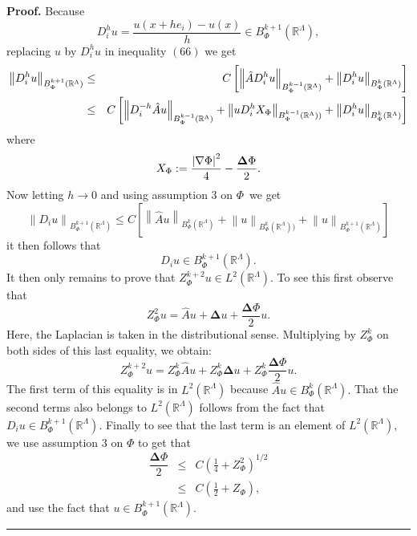 \documentclass{article}
\newenvironment{proof}[1][Proof]{\noindent\textbf{#1.} }{\ \rule{0.5em}{0.5em}}
\begin{document}
\begin{proof}
Because 
\begin{equation*}
D_{i}^{h}u=\dfrac{u(x+he_{i})-u(x)}{h}\in B_{\Phi }^{k+1}(\mathbb{R}%
^{\Lambda }),
\end{equation*}%
replacing $u$ by $D_{i}^{h}u$ in inequality $\left( 66\right) $ we get 
\begin{eqnarray*}
\left\| D_{i}^{h}u\right\| _{B_{\Phi }^{k+1}(\mathbb{R}^{\Lambda })} &\leq &C%
\left[ \left\| \hat{A}D_{i}^{h}u\right\| _{B_{\Phi }^{k-1}(\mathbb{R}%
^{\Lambda })}+\left\| D_{i}^{h}u\right\| _{B_{\Phi }^{k}(\mathbb{R}^{\Lambda
})}\right] \\
&\leq &C\left[ \left\| D_{i}^{-h}\hat{A}u\right\| _{B_{\Phi }^{k-1}(\mathbb{R%
}^{\Lambda })}+\left\| uD_{i}^{h}X_{\Phi }\right\| _{B_{\Phi }^{k-1}(\mathbb{%
R}^{\Lambda }))}+\left\| D_{i}^{h}u\right\| _{B_{\Phi }^{k}(\mathbb{R}%
^{\Lambda })}\right]
\end{eqnarray*}%
where 
\begin{equation*}
X_{\Phi }:=\dfrac{\left| \mathbf{\nabla }\Phi \right| ^{2}}{4}-\dfrac{%
\mathbf{\Delta }\Phi }{2}.
\end{equation*}%
Now letting $h\rightarrow 0$ and using assumption 3 on $\Phi $\ we get 
\begin{equation*}
\left\| D_{i}u\right\| _{B_{\Phi }^{k+1}(\mathbb{R}^{\Lambda })}\leq C\left[
\left\| \hat{A}u\right\| _{B_{\Phi }^{k}(\mathbb{R}^{\Lambda })}+\left\|
u\right\| _{B_{\Phi }^{k}(\mathbb{R}^{\Lambda }))}+\left\| u\right\|
_{B_{\Phi }^{k+1}(\mathbb{R}^{\Lambda })}\right]
\end{equation*}%
it then follows that 
\begin{equation*}
D_{i}u\in B_{\Phi }^{k+1}(\mathbb{R}^{\Lambda }).
\end{equation*}%
It then only remains to prove that $Z_{\Phi }^{k+2}u\in L^{2}(\mathbb{R}%
^{\Lambda })$. To see this first observe that 
\begin{equation}
Z_{\Phi }^{2}u=\hat{A}u+\mathbf{\Delta }u+\dfrac{\mathbf{\Delta }\Phi }{2}u.
\end{equation}%
Here, the Laplacian is taken in the distributional sense. Multiplying by $%
Z_{\Phi }^{k}$ on both sides of this last equality, we obtain:%
\begin{equation}
Z_{\Phi }^{k+2}u=Z_{\Phi }^{k}\hat{A}u+Z_{\Phi }^{k}\mathbf{\Delta }%
u+Z_{\Phi }^{k}\dfrac{\mathbf{\Delta }\Phi }{2}u.
\end{equation}%
The first term of this equality is in $L^{2}(\mathbb{R}^{\Lambda })$ because 
$\hat{A}u\in B_{\Phi }^{k}(\mathbb{R}^{\Lambda }).$ That the second terms
also belongs to $L^{2}(\mathbb{R}^{\Lambda })$ follows from the fact that $%
D_{i}u\in B_{\Phi }^{k+1}(\mathbb{R}^{\Lambda })$. Finally to see that the
last term is an element of $L^{2}(\mathbb{R}^{\Lambda }),$ we use assumption
3 on $\Phi $ to get that 
\begin{eqnarray}
\dfrac{\mathbf{\Delta }\Phi }{2} &\leq &C(\frac{1}{4}+Z_{\Phi }^{2})^{1/2} \\
&\leq &C(\frac{1}{2}+Z_{\Phi }),
\end{eqnarray}%
and use the fact that $u\in B_{\Phi }^{k+1}(\mathbb{R}^{\Lambda }).$
\end{proof}
\end{document}
